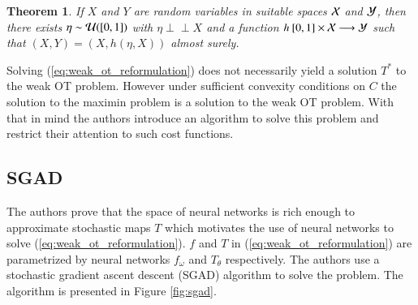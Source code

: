 \documentclass[11pt]{article}
\newtheorem{theorem}{Theorem}
\newcommand{\indep}{\perp \!\!\! \perp}
\begin{document}
\begin{theorem}
    If $X$ and $Y$ are random variables in suitable spaces ${\cal X}$ and ${\cal Y}$, then there exists $\eta\sim {\cal U}([0,1])$ with $\eta \indep X$ and a function $h\: [0, 1]\times {\cal X} \longrightarrow {\cal Y}$ such that $(X, Y) = (X, h(\eta, X))$ almost surely.
\end{theorem}

Solving (\ref{eq:weak_ot_reformulation}) does not necessarily yield a solution $T^*$ to the weak OT problem. However under sufficient convexity conditions on $C$ the solution to the maximin problem is a solution to the weak OT problem. With that in mind the authors introduce an algorithm to solve this problem and restrict their attention to such cost functions.

\subsection{SGAD}

The authors prove that the space of neural networks is rich enough to approximate stochastic maps $T$ which motivates the use of neural networks to solve (\ref{eq:weak_ot_reformulation}). $f$ and $T$ in (\ref{eq:weak_ot_reformulation}) are parametrized by neural networks $f_{\omega}$ and $T_{\theta}$ respectively. The authors use a stochastic gradient ascent descent (SGAD) algorithm to solve the problem. The algorithm is presented in Figure \ref{fig:sgad}.
\end{document}
